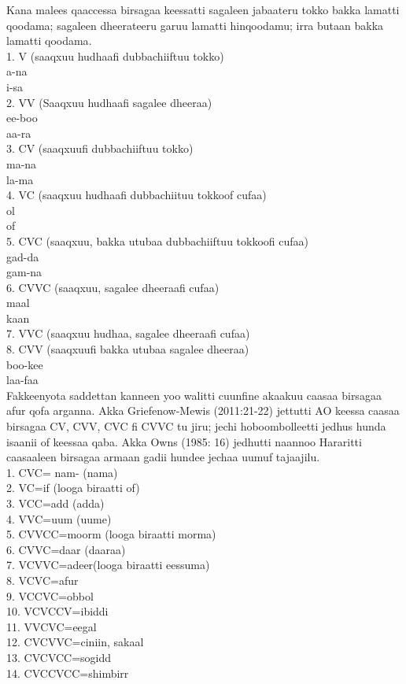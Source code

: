 \documentclass[11pt,b5paper]{book}
\begin{document}
\begin{itemize}
Kana malees qaaccessa birsagaa keessatti sagaleen jabaateru  tokko bakka lamatti qoodama; sagaleen dheerateeru garuu  lamatti hinqoodamu; irra butaan bakka lamatti qoodama\cite{griefenow2001grammatical}. \\
1. V (saaqxuu hudhaafi dubbachiiftuu tokko)  \\
 a-na  \\
 i-sa  \\
2. VV (Saaqxuu hudhaafi sagalee dheeraa)  \\
 ee-boo  \\
 aa-ra  \\
3. CV (saaqxuufi dubbachiiftuu tokko)  \\
 ma-na  \\
 la-ma  \\
4. VC (saaqxuu hudhaafi dubbachiituu tokkoof cufaa)  \\
 ol  \\
 of \\
5. CVC (saaqxuu, bakka utubaa dubbachiiftuu tokkoofi cufaa)  \\
 gad-da  \\
 gam-na  \\
6. CVVC (saaqxuu, sagalee dheeraafi cufaa)  \\
 maal  \\
 kaan  \\
7. VVC (saaqxuu hudhaa, sagalee dheeraafi cufaa)  \\
8. CVV (saaqxuufi bakka utubaa sagalee dheeraa)  \\
 boo-kee  \\
 laa-faa \\

Fakkeenyota saddettan kanneen yoo walitti cuunfine akaakuu  caasaa birsagaa afur qofa arganna. Akka Griefenow-Mewis  (2011:21-22) jettutti AO keessa caasaa birsagaa CV, CVV,  CVC fi CVVC tu jiru; jechi hoboombolleetti jedhus hunda  isaanii of keessaa qaba. Akka Owns (1985: 16) jedhutti  naannoo Hararitti caasaaleen birsagaa armaan gadii hundee  jechaa uumuf tajaajilu.  \\
 1. CVC= nam- (nama) \\
 2. VC=if (looga biraatti of) \\
 3. VCC=add (adda) \\
 4. VVC=uum (uume) \\
 5. CVVCC=moorm (looga biraatti morma) \\
 6. CVVC=daar (daaraa) \\
 7. VCVVC=adeer(looga biraatti eessuma) \\
 8. VCVC=afur \\
 9. VCCVC=obbol \\
 10. VCVCCV=ibiddi\\
 11. VVCVC=eegal \\
 12. CVCVVC=ciniin, sakaal\\
 13. CVCVCC=sogidd \\
 14. CVCCVCC=shimbirr \\


\end{itemize}
\end{document}
